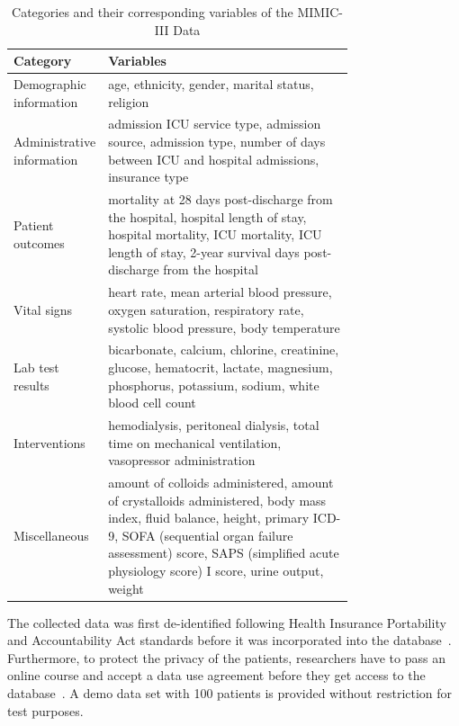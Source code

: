 \documentclass[aac,crcready]{iosart2x}
\begin{document}
\begin{table}[htbp]
\centering
\caption{Categories and their corresponding variables of the MIMIC-III Data}\label{t1}
\begin{tabular}{l p{0.75\linewidth}}
\hline
Category& Variables\\
\hline
Demographic information & age, ethnicity, gender, marital status, religion\\
Administrative information & admission ICU service type, admission source, admission type, number of days between ICU and hospital admissions, insurance type  \\
Patient outcomes & mortality at 28 days post-discharge from the hospital, hospital length of stay, hospital mortality, ICU mortality, ICU length of stay, 2-year survival days post-discharge from the hospital\\
Vital signs & heart rate, mean arterial blood pressure, oxygen saturation, respiratory rate, systolic blood pressure, body temperature\\
Lab test results & bicarbonate, calcium, chlorine, creatinine, glucose, hematocrit, lactate, magnesium, phosphorus, potassium, sodium, white blood cell count \\
Interventions & hemodialysis, peritoneal dialysis, total time on mechanical ventilation, vasopressor administration\\
Miscellaneous & amount of colloids administered, amount of crystalloids administered, body mass index, fluid balance, height, primary ICD-9, SOFA (sequential organ failure assessment) score, SAPS (simplified acute physiology score) I score, urine output, weight
\end{tabular}
\hline
\end{table}

The collected data was first de-identified following Health Insurance Portability and Accountability Act standards before it was incorporated into the database~\cite{Johnson.2020,Johnson.2016}.
Furthermore, to protect the privacy of the patients, researchers have to pass an online course and accept a data use agreement before they get access to the database~\cite{Johnson.2020,Johnson.2016}. A demo data set with 100 patients is provided without restriction for test purposes.
\end{document}
